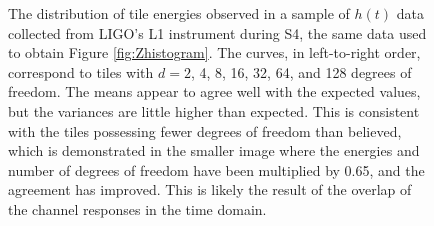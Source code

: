 \documentclass[10pt]{article}
\begin{document}
\begin{figure}
\begin{center}
\end{center}
\caption{The distribution of tile energies observed in a sample of \(h(t)\)
data collected from LIGO's L1 instrument during S4, the same data used to
obtain Figure \ref{fig:Zhistogram}.  The curves, in left-to-right order,
correspond to tiles with \(d = 2\), 4, 8, 16, 32, 64, and 128 degrees of
freedom.  The means appear to agree well with the expected values, but the
variances are little higher than expected.  This is consistent with the
tiles possessing fewer degrees of freedom than believed, which is
demonstrated in the smaller image where the energies and number of degrees
of freedom have been multiplied by 0.65, and the agreement has improved.
This is likely the result of the overlap of the channel responses in the
time domain.}
\label{fig:ehistogram}
\end{figure}
\end{document}
